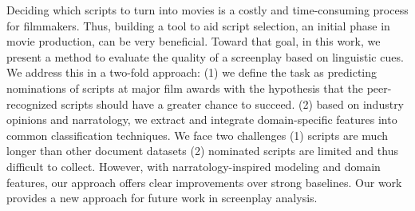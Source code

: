 Deciding which scripts to turn into movies is a costly and time-consuming process for filmmakers. Thus, building a tool to aid script selection, an initial phase in movie production, can be very beneficial. Toward that goal, in this work, we present a method to evaluate the quality of a screenplay based on linguistic cues. We address this in a two-fold approach: (1) we define the task as predicting nominations of scripts at major film awards with the hypothesis that the peer-recognized scripts should have a greater chance to succeed. (2) based on industry opinions and narratology, we extract and integrate domain-specific features into common classification techniques. We face two challenges (1) scripts are much longer than other document datasets (2) nominated scripts are limited and thus difficult to collect. However, with narratology-inspired modeling and domain features, our approach offers clear improvements over strong baselines. Our work provides a new approach for future work in screenplay analysis.
